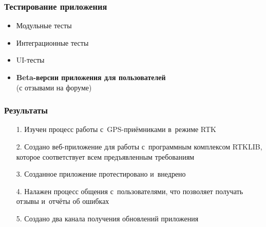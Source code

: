 \documentclass[xetex,с,aspectratio=169]{beamer}
\begin{document}
%
%
\begin{frame}
  \frametitle{Тестирование приложения}
  {
    \Large
    \begin{itemize}
      \setlength\itemsep{0.75em}
      \item Модульные тесты
      \item Интеграционные тесты
      \item UI-тесты\\[1.25em]
      \item \textbf{Beta-версии приложения для пользователей}\\[0.25em](с отзывами на форуме)
    \end{itemize}
  }
\end{frame}


%
%
\begin{frame}
  \frametitle{Результаты}
  {
    \large
    \begin{itemize}
      \setlength\itemsep{1em}
      \item[1.] Изучен процесс работы с~GPS-приёмниками в~режиме RTK
      \item[2.] Создано веб-приложение для работы с~программным комплексом RTKLIB, которое соответствует всем предъявленным требованиям
      \item[3.] Созданное приложение протестировано и~внедрено
      \item[4.] Налажен процесс общения с~пользователями, что позволяет получать отзывы и~отчёты об ошибках
      \item[5.] Создано два канала получения обновлений приложения
    \end{itemize}
  }
\end{frame}


%
%
\begin{frame}[c]
\begin{center}
  \Huge\bfseries
  \color{ifmoblue}{Спасибо за внимание}
\end{center}
\end{frame}
\end{document}
